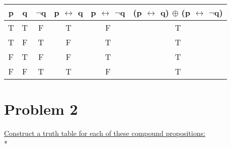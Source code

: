 \documentclass[11pt]{article}
\begin{document}
		\begin{center}
			\begin{tabular}{||c | c | c | c | c | c||}
				\hline
				p & q & $\neg$q & p $\leftrightarrow$ q & p $\leftrightarrow$ $\neg$q & (p $\leftrightarrow$ q) $\oplus$ (p $\leftrightarrow$ $\neg$q)\\
				[0.5ex]
				\hline\hline
				T & T & F & T & F & T\\
				\hline
				T & F & T & F & T & T\\
				\hline
				F & T & F & F & T & T\\
				\hline
				F & F & T & T & F & T\\
				\hline
			\end{tabular}
		\end{center}
	
	\section*{Problem 2}
	{\underline{Construct a truth table for each of these compound propositions:}}\\*\\
\end{document}
